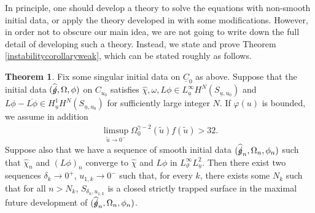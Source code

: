 \documentclass[11pt,reqno]{amsart}
\theoremstyle{definition}
\newtheorem{theorem}{Theorem}[section]
\numberwithin{equation}{section}
\def\chih{\widehat{\chi}}
\def\ub{\underline{u}}
\def\Cb{\underline{C}}
\newcommand{\tu}{\widetilde{u}}
\def\gs{\mbox{$g \mkern -9mu /$}}
\begin{document}
In principle, one should develop a theory to solve the equations with non-smooth initial data, or apply the theory developed in \cite{L-R1} with some modifications.  However, in order not to obscure our main idea, we are not going to write down the full detail of developing such a theory. Instead, we state and prove Theorem \ref{instabilitycorollaryweak}, which can be stated roughly as follows.
\begin{theorem}\label{instabilityweak-intro}
Fix some singular initial data on $\Cb_0$ as above. Suppose that the initial data $(\widehat{\gs},\Omega,\phi)$ on $C_{u_0}$ satisfies $\chih,\omega,L\phi\in L^\infty_{\ub}H^N(S_{\ub,u_0})$ and $L\phi-\overline{L\phi}\in H^1_{\ub}H^N(S_{\ub,u_0})$ for sufficiently large integer $N$. If $\varphi(u)$ is bounded, we assume in addition
\begin{align}\label{instabilitycondition-chih-introweak}
\limsup_{\tu\to0^-}\Omega_0^{\gamma-2}(\tu)f(\tu)>32.
\end{align} 
Suppose also that we have a sequence of smooth initial data $(\widehat{\gs}_n,\Omega_n,\phi_n)$ such that $\chih_n$ and $(L\phi)_n$ converge to $\chih$ and $L\phi$ in $L^\infty_\vartheta L^2_{\ub}$. Then there exist two sequences $\delta_k\to0^+$, $u_{1,k}\to0^-$ such that, for every $k$, there exists some $N_k$ such that for all $n>N_k$, $S_{\delta_k,u_{1,k}}$ is a closed strictly trapped surface in the maximal future development of $(\widehat{\gs}_n,\Omega_n,\phi_n)$.
\end{theorem}
\end{document}

